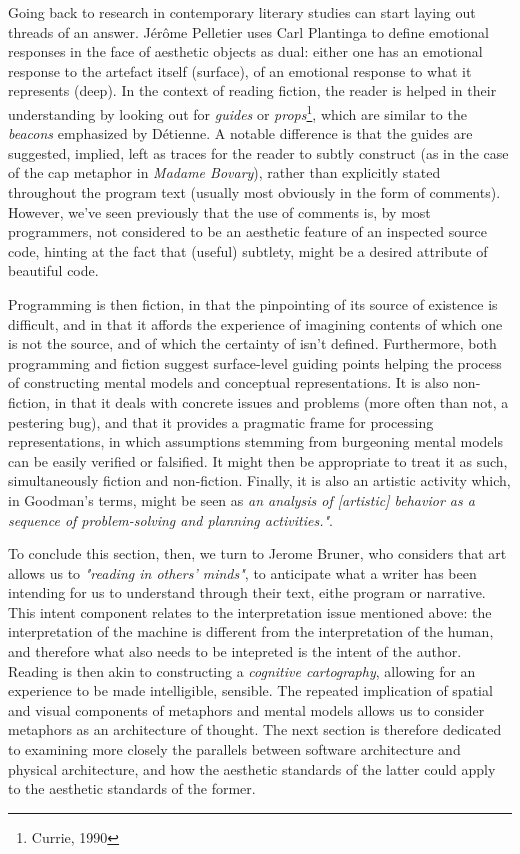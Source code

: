 \documentclass{article}
\begin{document}
Going back to research in contemporary literary studies can start laying out threads of an answer. Jérôme Pelletier uses Carl Plantinga to define emotional responses in the face of aesthetic objects as dual: either one has an emotional response to the artefact itself (surface), of an emotional response to what it represents (deep). In the context of reading fiction, the reader is helped in their understanding by looking out for \emph{guides} or \emph{props}\footnote{Currie, 1990}, which are similar to the \emph{beacons} emphasized by Détienne. A notable difference is that the guides are suggested, implied, left as traces for the reader to subtly construct (as in the case of the cap metaphor in \emph{Madame Bovary}), rather than explicitly stated throughout the program text (usually most obviously in the form of comments). However, we've seen previously that the use of comments is, by most programmers, not considered to be an aesthetic feature of an inspected source code, hinting at the fact that (useful) subtlety, might be a desired attribute of beautiful code.

Programming is then fiction, in that the pinpointing of its source of existence is difficult, and in that it affords the experience of imagining contents of which one is not the source, and of which the certainty of isn't defined. Furthermore, both programming and fiction suggest surface-level guiding points helping the process of constructing mental models and conceptual representations. It is also non-fiction, in that it deals with concrete issues and problems (more often than not, a pestering bug), and that it provides a pragmatic frame for processing representations, in which assumptions stemming from burgeoning mental models can be easily verified or falsified. It might then be appropriate to treat it as such, simultaneously fiction and non-fiction. Finally, it is also an artistic activity which, in Goodman's terms, might be seen as \emph{an analysis of [artistic] behavior as a sequence of problem-solving and planning activities."}\cite{goodman_basic_1972}.

To conclude this section, then, we turn to Jerome Bruner, who considers that art allows us to \emph{"reading in others' minds"}, to anticipate what a writer has been intending for us to understand through their text, eithe program or narrative. This intent component relates to the interpretation issue mentioned above: the interpretation of the machine is different from the interpretation of the human, and therefore what also needs to be intepreted is the intent of the author. Reading is then akin to constructing a \emph{cognitive cartography}, allowing for an experience to be made intelligible, sensible. The repeated implication of spatial and visual components of metaphors and mental models allows us to consider metaphors as an architecture of thought\cite{forsythe_cathedrals_1986}. The next section is therefore dedicated to examining more closely the parallels between software architecture and physical architecture, and how the aesthetic standards of the latter could apply to the aesthetic standards of the former.
\end{document}
